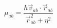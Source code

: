 \documentclass[12pt]{article}
\begin{document}
$$
  \mu_{ab} = \frac{h \vec{v}_{ab} \cdot \vec{r}_{ab}}{\vec{r}_{ab}^2 + \eta^2}
$$  
\end{document}
